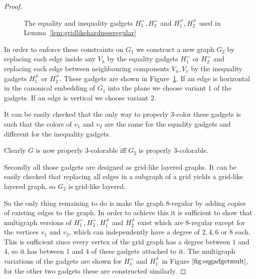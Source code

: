\documentclass[10pt,a4paper]{article}
\numberwithin{equation}{section}
\theoremstyle{definition}
\begin{document}
\begin{proof}
\begin{figure}[tpb]

        \caption{The equality and inequality gadgets $H^=_1, H^=_2$ and $H^{\neq}_1, H^{\neq}_2$ used in Lemma~\ref{lem:gridlikehardnessregular}}
        \label{fig:eqneqgadget}
    \end{figure}

    In order to enforce these constraints on $G_1$ we construct a new graph $G_2$ by replacing each edge inside any $V_h$ by the equality gadgets $H^=_1$ or $H^=_2$ and replacing each edge between neighbouring components $V_u, V_v$ by the inequality gadgets $H^{\neq}_1$ or $H^{\neq}_2$.
    These gadgets are shown in Figure~\ref{fig:eqneqgadget}.
    If an edge is horizontal in the canonical embedding of $G_1$ into the plane we choose variant $1$ of the gadgets. If an edge is vertical we choose variant $2$.

    It can be easily checked that the only way to properly $3$-color these gadgets is such that the colors of $v_1$ and $v_2$ are the same for the equality gadgets and different for the inequality gadgets.
    
    Clearly $G$ is now properly $3$-colorable iff $G_2$ is properly $3$-colorable.

    Secondly all those gadgets are designed as grid-like layered graphs.
    It can be easily checked that replacing all edges in a subgraph of a grid yields a grid-like layered graph, so $G_2$ is grid-like layered.

    So the only thing remaining to do is make the graph $8$-regular by adding copies of existing edges to the graph.
    In order to achieve this it is sufficient to show that multigraph versions of $H^=_1, H^=_2, H^{\neq}_1$ and $H^{\neq}_2$ exist which are $8$-regular except for the vertices $v_1$ and $v_2$, which can independently have a degree of $2, 4, 6$ or $8$ each.
    This is sufficient since every vertex of the grid graph has a degree between $1$ and $4$, so it has between $1$ and $4$ of these gadgets attached to it.
    The multigraph variations of the gadgets are shown for $H^=_1$ and $H^{\neq}_1$ in Figure $\ref{fig:eqgadgetmult}$, for the other two gadgets these are constructed similarly.


\end{proof}
\end{document}
